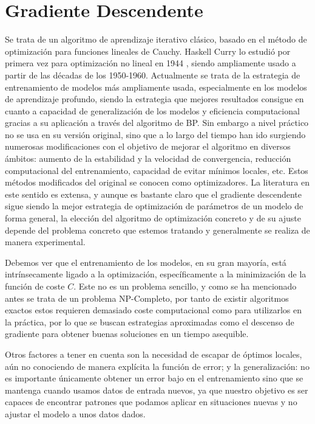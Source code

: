 \section{Gradiente Descendente}

Se trata de un algoritmo de aprendizaje iterativo clásico, basado en el método de optimización para funciones lineales de Cauchy. Haskell Curry lo estudió por primera vez para optimización no lineal en 1944 \cite{Curry1944GDNoLin}, siendo ampliamente usado a partir de las décadas de los 1950-1960. Actualmente se trata de la estrategia de entrenamiento de modelos más ampliamente usada, especialmente en los modelos de aprendizaje profundo, siendo la estrategia que mejores resultados consigue en cuanto a capacidad de generalización de los modelos y eficiencia computacional gracias a su aplicación a través del algoritmo de BP. Sin embargo a nivel práctico no se usa en su versión original, sino que a lo largo del tiempo han ido surgiendo numerosas modificaciones con el objetivo de mejorar el algoritmo en diversos ámbitos: aumento de la estabilidad y la velocidad de convergencia, reducción computacional del entrenamiento, capacidad de evitar mínimos locales, etc. Estos métodos modificados del original se conocen como optimizadores. La literatura en este sentido es extensa, y aunque es bastante claro que el gradiente descendente sigue siendo la mejor estrategia de optimización de parámetros de un modelo de forma general, la elección del algoritmo de optimización concreto y de su ajuste depende del problema concreto que estemos tratando y generalmente se realiza de manera experimental. 

Debemos ver que el entrenamiento de los modelos, en su gran mayoría, está intrínsecamente ligado a la optimización, específicamente a la minimización de la función de coste $C$. Este no es un problema sencillo, y como se ha mencionado antes se trata de un problema NP-Completo, por tanto de existir algoritmos exactos estos requieren demasiado coste computacional como para utilizarlos en la práctica, por lo que se buscan estrategias aproximadas como el descenso de gradiente para obtener buenas soluciones en un tiempo asequible. 

Otros factores a tener en cuenta son la necesidad de escapar de óptimos locales, aún no conociendo de manera explícita la función de error; y la generalización: no es  importante únicamente obtener un error bajo en el entrenamiento sino que se mantenga cuando usamos datos de entrada nuevos, ya que nuestro objetivo es ser capaces de encontrar patrones que podamos aplicar en situaciones nuevas y no ajustar el modelo a unos datos dados.


